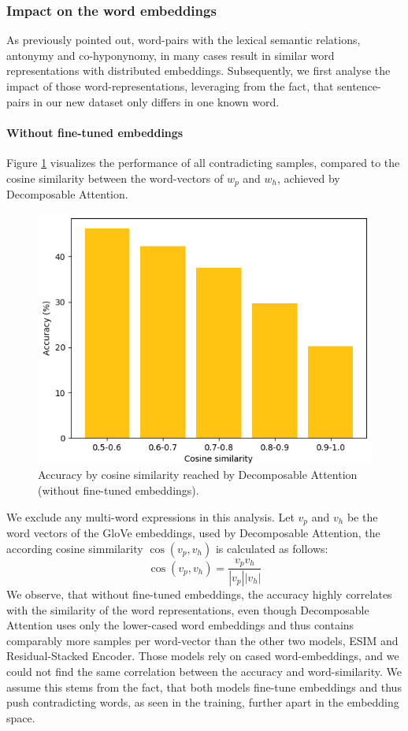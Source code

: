 \subsubsection{Impact on the word embeddings}
As previously pointed out, word-pairs with the lexical semantic relations, antonymy and co-hyponynomy, in many cases result in similar word representations with distributed embeddings. Subsequently, we first analyse the impact of those word-representations, leveraging from the fact, that sentence-pairs in our new dataset only differs in one known word.
\paragraph*{Without fine-tuned embeddings}
Figure \ref{fig:decomp_acc_per_cos_sim} visualizes the performance of all contradicting samples, compared to the cosine similarity between the word-vectors of $w_p$ and $w_h$, achieved by Decomposable Attention. 
\begin{figure}[tph!]
\centering
	\includegraphics[totalheight=5cm]{fig/acc_by_cos.png}
	\caption{Accuracy by cosine similarity reached by Decomposable Attention (without fine-tuned embeddings).}
	\label{fig:decomp_acc_per_cos_sim}
\end{figure}
We exclude any multi-word expressions in this analysis. Let $v_p$ and $v_h$ be the word vectors of the GloVe embeddings, used by Decomposable Attention, the according cosine simmilarity $\cos(v_p,v_h)$ is calculated as follows:
\begin{equation}
\cos(v_p,v_h) = \frac{v_p v_h}{|v_p| |v_h|}
\end{equation}
We observe, that without fine-tuned embeddings, the accuracy highly correlates with the similarity of the word representations, even though Decomposable Attention uses only the lower-cased word embeddings and thus contains comparably more samples per word-vector than the other two models, ESIM and Residual-Stacked Encoder. Those models rely on cased word-embeddings, and we could not find the same correlation between the accuracy and word-similarity. We assume this stems from the fact, that both models fine-tune embeddings and thus push contradicting words, as seen in the training, further apart in the embedding space. 
